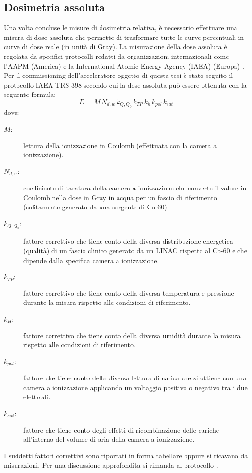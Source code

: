 \subsection{Dosimetria assoluta}
Una volta concluse le misure di dosimetria relativa, è necessario effettuare una misura di dose assoluta che permette di trasformare tutte le curve percentuali in curve di dose reale (in unità di Gray). La misurazione della dose assoluta è regolata da specifici protocolli redatti da organizzazioni internazionali come l'AAPM (America) \cite{Almond1999} e la International Atomic Energy Agency (IAEA) (Europa) \cite{Andreo2006}.\\
Per il commissioning dell'acceleratore oggetto di questa tesi è stato seguito il protocollo IAEA TRS-398 secondo cui la dose assoluta può essere ottenuta con la seguente formula:
\begin{equation}
D = M\,N_{d,w}\,k_{Q,Q_0}\,k_{TP}\,k_h\,k_{pol}\,k_{sat}
\end{equation}
dove:
\begin{description}
\item[$M:$] lettura della ionizzazione in Coulomb (effettuata con la camera a ionizzazione).
\item[$N_{d,w}:$] coefficiente di taratura della camera a ionizzazione che converte il valore in Coulomb nella dose in Gray in acqua per un fascio di riferimento (solitamente generato da una sorgente di Co-60).
\item[$k_{Q,Q_0}:$] fattore correttivo che tiene conto della diversa distribuzione energetica (qualità) di un fascio clinico generato da un LINAC rispetto al Co-60 e che dipende dalla specifica camera a ionizzazione.
\item[$k_{TP}:$] fattore correttivo che tiene conto della diversa temperatura e pressione durante la misura rispetto alle condizioni di riferimento.
\item[$k_{H}:$] fattore correttivo che tiene conto della diversa umidità durante la misura rispetto alle condizioni di riferimento.
\item[$k_{pol}:$] fattore che tiene conto della diversa lettura di carica che si ottiene con una camera a ionizzazione applicando un voltaggio positivo o negativo tra i due elettrodi.
\item[$k_{sat}:$] fattore che tiene conto degli effetti di ricombinazione delle cariche all'interno del volume di aria della camera a ionizzazione.
\end{description}
I suddetti fattori correttivi sono riportati in forma tabellare oppure si ricavano da misurazioni. Per una discussione approfondita si rimanda al protocollo \cite{Andreo2006}.

